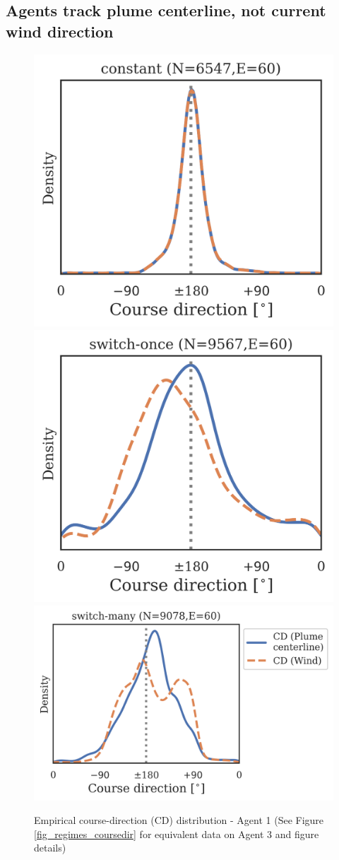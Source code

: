 \documentclass[5p,twocolumn,authoryear]{elsarticle}
\begin{document}
\clearpage
\subsection{Agents track plume centerline, not current wind direction}
\label{sec_supp_centerline}



\begin{figure}[h!]
\centering
\includegraphics[width=0.28\linewidth]{regime_dists_2760377_constantx5b5_TRACK_CD.png}
\includegraphics[width=0.28\linewidth]{regime_dists_2760377_switch45x5b5_TRACK_CD.png}
\includegraphics[width=0.405\linewidth]{regime_dists_2760377_noisy3x5b5_TRACK_CD.png}
\caption{Empirical course-direction (CD) distribution - Agent 1 (See Figure \ref{fig_regimes_coursedir} for equivalent data on Agent 3 and figure details)} 
\end{figure}
\end{document}
